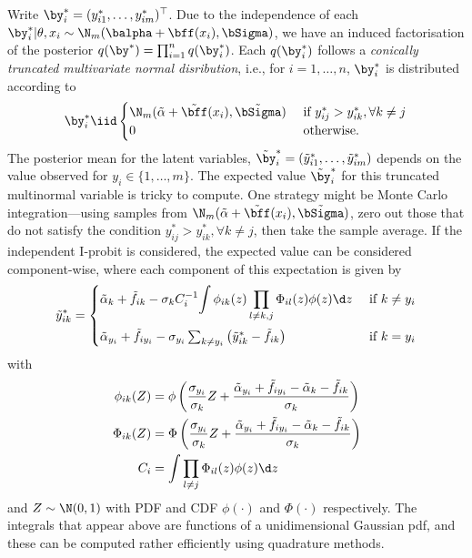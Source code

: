 Write $\by_i^* = (y_{i1}^*,\dots,y_{im}^*)^\top$.
Due to the independence of each $\by_{i}^*|\theta,x_i \sim \N_m(\balpha + \bff(x_i),\bSigma)$, we have an induced factorisation of the posterior $q(\by^*) = \prod_{i=1}^n q(\by_i^*)$.
Each $q(\by_i^*)$ follows a \emph{conically truncated multivariate normal disribution}, i.e., for $i=1,\dots,n$, $\by_i^*$ is distributed according to
\begin{align}\label{eq:ystardist}
  \by_i^* \iid
  \begin{cases}
    \N_m(\tilde \alpha + \tilde \bff(x_i), \tilde\bSigma) & \text{ if } y_{ij}^* > y_{ik}^*, \forall k \neq j \\
    0 & \text{ otherwise}. \\
  \end{cases}
\end{align}
The posterior mean for the latent variables, $\tilde\by_i^* = (\tilde y_{i1}^*,\dots,\tilde y_{im}^*)$ depends on the value observed for $y_i \in \{1,\dots,m\}$. 
The expected value $\tilde\by_i^*$ for this truncated multinormal variable is tricky to compute.
One strategy might be Monte Carlo integration---using samples from $\N_m(\tilde \alpha + \tilde \bff(x_i), \tilde\bSigma)$, zero out those that do not satisfy the condition $y_{ij}^* > y_{ik}^*, \forall k \neq j$, then take the sample average.
If the independent I-probit is considered, the expected value can be considered component-wise, where each component of this expectation is given by
\begin{align}\label{eq:ystarupdate}
  \tilde y_{ik}^* =
  \begin{cases}
    \tilde\alpha_k + \tilde f_{ik} - \sigma_k C_i^{-1} \displaystyle{  \int \phi_{ik}(z) \prod_{l \neq k,j} \Phi_{il}(z) \phi(z) \d z }
    &\text{ if } k \neq y_i \\[1.5em]
    \tilde\alpha_{y_i} + \tilde f_{iy_i} - \sigma_{y_i} \sum_{k \neq y_i} \big(\tilde y_{ik}^* - \tilde f_{ik} \big) 
    &\text{ if } k = y_i \\
  \end{cases}
\end{align}
with 
\begin{align*}
  \phi_{ik}(Z) &= \phi \left(\frac{\sigma_{y_i}}{\sigma_k} Z + \frac{\tilde\alpha_{y_i} + \tilde f_{iy_i} - \tilde\alpha_k - \tilde f_{ik}}{\sigma_k} \right) \\
  \Phi_{ik}(Z) &= \Phi \left(\frac{\sigma_{y_i}}{\sigma_k} Z + \frac{\tilde\alpha_{y_i} + \tilde f_{iy_i} - \tilde\alpha_k - \tilde f_{ik}}{\sigma_k} \right) \\
  C_i &= \int \prod_{l \neq j} \Phi_{il}(z) \phi(z) \d z
\end{align*}
and $Z \sim \N(0,1)$ with PDF and CDF $\phi(\cdot)$ and $\Phi(\cdot)$ respectively. 
The integrals that appear above are functions of a unidimensional Gaussian pdf, and these can be computed rather efficiently using quadrature methods.

